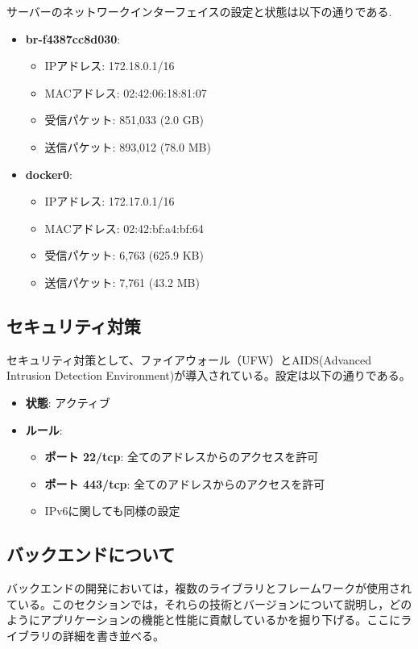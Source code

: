 \documentclass[b5paper,12pt]{jsreport}
\begin{document}
サーバーのネットワークインターフェイスの設定と状態は以下の通りである.

\begin{itemize}
    \item \textbf{br-f4387cc8d030}:
    \begin{itemize}
        \item IPアドレス: 172.18.0.1/16
        \item MACアドレス: 02:42:06:18:81:07
        \item 受信パケット: 851,033 (2.0 GB)
        \item 送信パケット: 893,012 (78.0 MB)
    \end{itemize}

    \item \textbf{docker0}:
    \begin{itemize}
        \item IPアドレス: 172.17.0.1/16
        \item MACアドレス: 02:42:bf:a4:bf:64
        \item 受信パケット: 6,763 (625.9 KB)
        \item 送信パケット: 7,761 (43.2 MB)
    \end{itemize}
\end{itemize}

\subsection{セキュリティ対策}
セキュリティ対策として、ファイアウォール（UFW）とAIDS(Advanced Intrusion Detection Environment)が導入されている。設定は以下の通りである。


\begin{itemize}
    \item \textbf{状態}: アクティブ
    \item \textbf{ルール}:
    \begin{itemize}
        \item \textbf{ポート 22/tcp}: 全てのアドレスからのアクセスを許可
        \item \textbf{ポート 443/tcp}: 全てのアドレスからのアクセスを許可
        \item IPv6に関しても同様の設定
    \end{itemize}
\end{itemize}

\subsection{バックエンドについて}
バックエンドの開発においては，複数のライブラリとフレームワークが使用されている。このセクションでは，それらの技術とバージョンについて説明し，どのようにアプリケーションの機能と性能に貢献しているかを掘り下げる。ここにライブラリの詳細を書き並べる。
\end{document}
